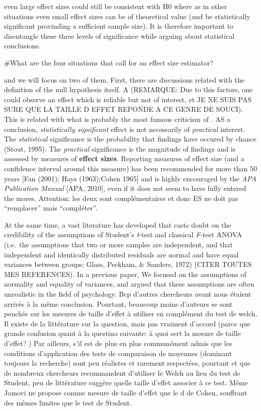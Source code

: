 \documentclass[man]{apa6}
\begin{document}
even large effect sizes could still be consistent with H0 where as in other situations even small effect sizes can be of theoretical value (and be statistically significant provinding a sufficient sample size). It is therefore important to disentangle these three levels of significance while arguing about statistical conclusions.

\#What are the four situations that call for an effect size estimator?

and we will focus on two of them. First, there are discussions related with the definition of the null hypothesis itself. A (REMARQUE: Due to this factors, one could observe an effect which is reliable but not of interest, et JE NE SUIS PAS SURE QUE LA TAILLE D EFFET REPONDE A CE GENRE DE SOUCI). This is related with what is probably the most famous criticism of . AS a conclusion, \emph{statistically significant} effect is not necessarily of \emph{practical} interest. The \emph{statistical} significance is the probability that findings have occured by chance (Stout, 1995). The \emph{practical} significance is the magnitude of findings and is assessed by measures of \textbf{effect sizes}. Reporting measures of effect size (and a confidence interval around this measure) has been recommended for more than 50 years {[}Fan (2001); Hays (1963);Cohen 1965{]} and is highly encouraged by the \emph{APA Publication Manual} {[}APA, 2010{]}, even if it does not seem to have fully entered the mores. Attention: les deux sont complémentaires et donc ES ne doit pas \enquote{remplacer} mais \enquote{compléter}.

At the same time, a vast literature has developed that casts doubt on the credibility of the assumptions of Student's \emph{t}-test and classical \emph{F}-test ANOVA (i.e.~the assumptions that two or more samples are independent, and that independent and identically distributed residuals are normal and have equal variances between groups; Glass, Peckham, \& Sanders, 1972) (CITER TOUTES MES REFERENCES). In a previous paper, We focused on the assumptions of normality and equality of variances, and argued that these assumptions are often unrealistic in the field of psychology. Bcp d'autres chercheurs avant nous étaient arrivés à la même conclusion. Pourtant, beaucoup moins d'auteurs se sont penchés sur les mesures de taille d'effet à utiliser en complément du test de welch. Il existe de la littérature sur la question, mais pas vraiment d'accord (parce que grande confusion quant à la questino suivante: à quoi sert la mesure de taille d'effet? ) Par ailleurs, s'il est de plus en plus communément admis que les conditions d'application des tests de comparaison de moyennes (dominant toujours la recherche) sont peu réalistes et rarement respectées, pourtant et que de nombreux chercheurs recommandent d'utiliser le Welch au lieu du test de Student, peu de littérature suggère quelle taille d'effet associer à ce test. Même Jamovi ne propose comme mesure de taille d'effet que le d de Cohen, souffrant des mêmes limites que le test de Student.
\end{document}
